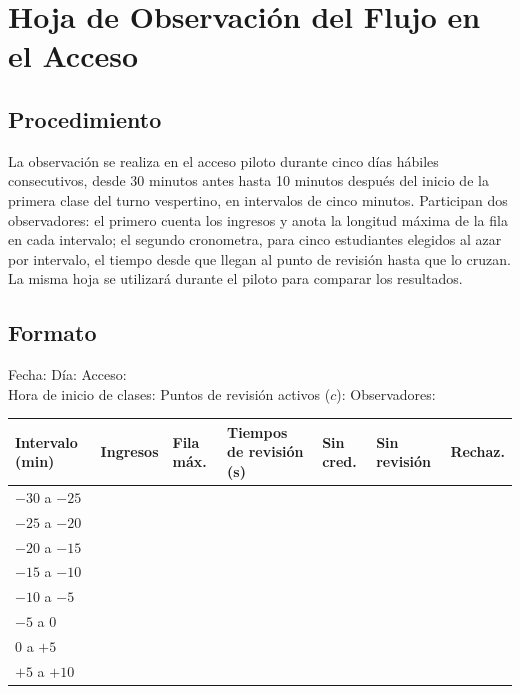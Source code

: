 \section{Hoja de Observación del Flujo en el Acceso}

\subsection{Procedimiento}
La observación se realiza en el acceso piloto durante cinco días hábiles
consecutivos, desde 30 minutos antes hasta 10 minutos después del inicio de la
primera clase del turno vespertino, en intervalos de cinco minutos. Participan
dos observadores: el primero cuenta los ingresos y anota la longitud máxima de
la fila en cada intervalo; el segundo cronometra, para cinco estudiantes
elegidos al azar por intervalo, el tiempo desde que llegan al punto de revisión
hasta que lo cruzan. La misma hoja se utilizará durante el piloto para comparar
los resultados.

\subsection{Formato}
\noindent Fecha: \linea[3cm] \quad Día: \linea[2.5cm] \quad Acceso:
\linea[3cm]\\[0.5em]
Hora de inicio de clases: \linea[2cm] \quad Puntos de revisión activos ($c$):
\linea[1.5cm] \quad Observadores: \linea[3cm]

\medskip
\noindent
{\small
	\begin{tabular}{|p{2.2cm}|p{1.3cm}|p{1.3cm}|p{4.2cm}|p{1.2cm}|p{1.2cm}|p{1.2cm}|}
		\hline
		\textbf{Intervalo (min)}         & \textbf{Ingresos}  & \textbf{Fila máx.} &
		\textbf{Tiempos de revisión (s)} & \textbf{Sin cred.} & \textbf{Sin
		revisión}                        & \textbf{Rechaz.}                                    \\
		\hline
		$-30$ a $-25$                    &                    &                    &   &  &  & \\[0.8em] \hline
		$-25$ a $-20$                    &                    &                    &   &  &  & \\[0.8em] \hline
		$-20$ a $-15$                    &                    &                    &   &  &  & \\[0.8em] \hline
		$-15$ a $-10$                    &                    &                    &   &  &  & \\[0.8em] \hline
		$-10$ a $-5$                     &                    &                    &   &  &  & \\[0.8em] \hline
		$-5$ a $0$                       &                    &                    &   &  &  & \\[0.8em] \hline
		$0$ a $+5$                       &                    &                    &   &  &  & \\[0.8em] \hline
		$+5$ a $+10$                     &                    &                    &   &  &  & \\[0.8em] \hline
	\end{tabular}}

